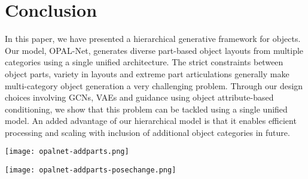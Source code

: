\documentclass[runningheads]{llncs}
\begin{document}
\section{Conclusion}

In this paper, we have presented a hierarchical generative framework for objects. Our model, OPAL-Net, generates diverse part-based object layouts from multiple categories using a single unified architecture. The strict constraints between object parts, variety in layouts and extreme part articulations generally make multi-category object generation a very challenging problem. Through our design choices involving GCNs, VAEs and guidance using object attribute-based conditioning, we show that this problem can be tackled using a single unified model. An added advantage of our hierarchical model is that it enables efficient processing and scaling with inclusion of additional object categories in future.

\begin{figure*}[!ht]
  \centering
  \texttt{[image: opalnet-addparts.png]}
  \caption{For each test layout image (cyan border), a new part label is specified for inclusion via $\mathsf{BoxVAE}$'s conditioning. This causes $\mathsf{BoxVAE}$ to `hallucinate' the newly added part. The usual box-conditioned generation of masks in $\mathsf{LabelMapVAE}$ results in a plausible part map of the user-specified part added to the test image's layout. The added parts are mentioned with prefix $+$.}
  \label{fig:addparts}
\end{figure*}

\begin{figure*}[!ht]
  \centering
  \texttt{[image: opalnet-addparts-posechange.png]}
  \caption{The depictions here share the same description as Figure~\ref{fig:addparts}. The distinctive feature is that addition or deletion of certain parts sometimes results in part lists which are highly correlated with specific camera viewpoints.}
  \label{fig:addparts2}
\end{figure*}

\clearpage



\end{document}
